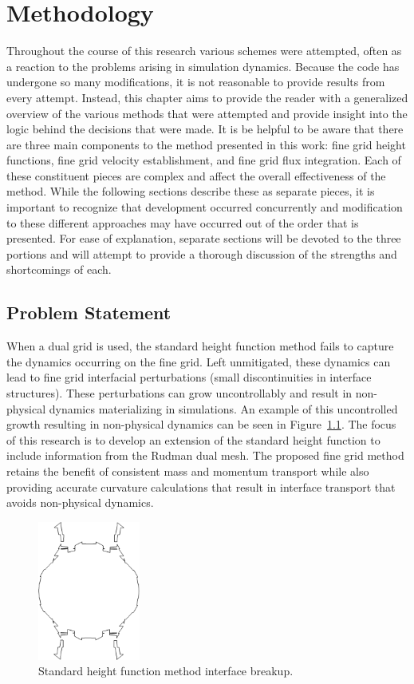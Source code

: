 \chapter{Methodology} \label{CH:method}

Throughout the course of this research various schemes were attempted, often as a reaction to the problems arising in simulation dynamics. Because the code has undergone so many modifications, it is not reasonable to provide results from every attempt. Instead, this chapter aims to provide the reader with a generalized overview of the various methods that were attempted and provide insight into the logic behind the decisions that were made. It is be helpful to be aware that there are three main components to the method presented in this work: fine grid height functions, fine grid velocity establishment, and fine grid flux integration. Each of these constituent pieces are complex and affect the overall effectiveness of the method. While the following sections describe these as separate pieces, it is important to recognize that development occurred concurrently and modification to these different approaches may have occurred out of the order that is presented. For ease of explanation, separate sections will be devoted to the three portions and will attempt to provide a thorough discussion of the strengths and shortcomings of each.

\section{Problem Statement}
When a dual grid is used, the standard height function method fails to capture the dynamics occurring on the fine grid. Left unmitigated, these dynamics can lead to fine grid interfacial perturbations (small discontinuities in interface structures). These perturbations can grow uncontrollably and result in non-physical dynamics materializing in simulations. An example of this uncontrolled growth resulting in non-physical dynamics can be seen in Figure~\ref{bad2}. The focus of this research is to develop an extension of the standard height function to include information from the Rudman dual mesh. The proposed  fine grid method retains the benefit of consistent mass and momentum transport while also providing accurate curvature calculations that result in interface transport that avoids non-physical dynamics. 
\begin{figure}[htbp]
	\centering
	\includegraphics[width=0.3\textwidth]{figs/bad.png}
	\caption{Standard height function method interface breakup.}
	\label{bad2} 
\end{figure} 

